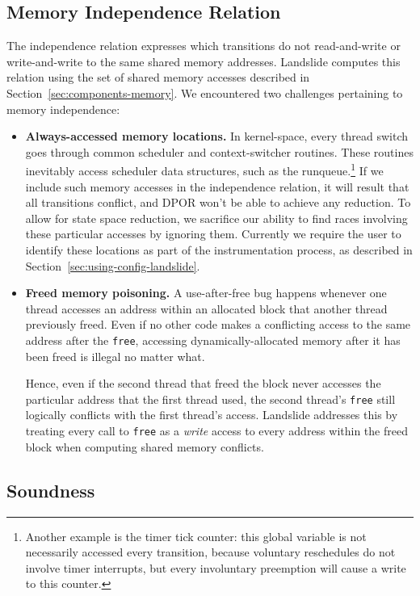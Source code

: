\subsection{Memory Independence Relation}
\label{sec:por-independence}
The independence relation expresses which transitions do not read-and-write or write-and-write to the same shared memory addresses. Landslide computes this relation using the set of shared memory accesses described in Section~\ref{sec:components-memory}. We encountered two challenges pertaining to memory independence:

\begin{itemize}
	\item {\bf Always-accessed memory locations.}
		In kernel-space, every thread switch goes through common scheduler and context-switcher routines. These routines inevitably access scheduler data structures, such as the runqueue.\footnote{
		Another example is the timer tick counter: this global variable is not necessarily accessed every transition, because voluntary reschedules do not involve timer interrupts, but every involuntary preemption will cause a write to this counter.}
		If we include such memory accesses in the independence relation, it will result that all transitions conflict, and DPOR won't be able to achieve any reduction. To allow for state space reduction, we sacrifice our ability to find races involving these particular accesses by ignoring them. Currently we require the user to identify these locations as part of the instrumentation process, as described in Section~\ref{sec:using-config-landslide}.
	\item {\bf Freed memory poisoning.}
		A use-after-free bug happens whenever one thread accesses an address within an allocated block that another thread previously freed. Even if no other code makes a conflicting access to the same address after the \texttt{free}, accessing dynamically-allocated memory after it has been freed is illegal no matter what.

		Hence, even if the second thread that freed the block never accesses the particular address that the first thread used, the second thread's \texttt{free} still logically conflicts with the first thread's access. Landslide addresses this by treating every call to \texttt{free} as a {\em write} access to every address within the freed block when computing shared memory conflicts.
\end{itemize}

\subsection{Soundness}

